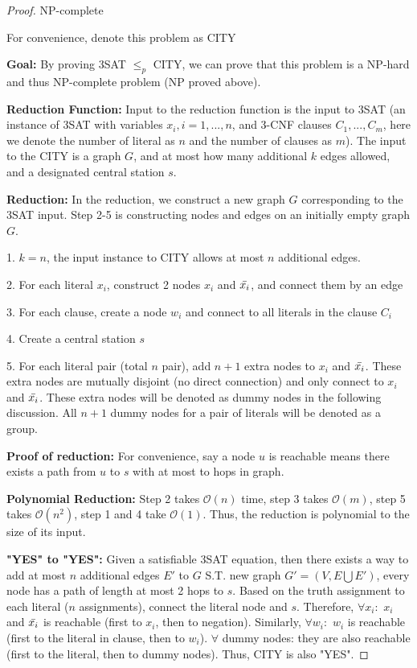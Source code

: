 \documentclass[openany]{article}
\begin{document}
\begin{proof}{NP-complete}

    For convenience, denote this problem as CITY
    
    \textbf{Goal:} By proving 3SAT $\leqslant_p$ CITY, we can prove that this problem is a NP-hard and thus NP-complete problem (NP proved above).

     \textbf{Reduction Function:} Input to the reduction function is the input to 3SAT (an instance of 3SAT with variables $x_i, i = 1,...,n$, and 3-CNF clauses $C_1, ..., C_m$, here we denote the number of literal as $n$ and the number of clauses as $m$). The input to the CITY is a graph $G$, and at most how many additional $k$ edges allowed, and a designated central station $s$. 

    \textbf{Reduction:} In the reduction, we construct a new graph $G$ corresponding to the 3SAT input. Step 2-5 is constructing nodes and edges on an initially empty graph $G$.
    
    1. $k=n$, the input instance to CITY allows at most $n$ additional edges.

    2. For each literal $x_i$, construct 2 nodes $x_i$ and $\Bar{x_i}$, and connect them by an edge

    3. For each clause, create a node $w_i$ and connect to all literals in the clause $C_i$

    4. Create a central station $s$

    5. For each literal pair (total $n$ pair), add $n+1$ extra nodes to $x_i$ and $\Bar{x_i}$. These extra nodes are mutually disjoint (no direct connection) and only connect to $x_i$ and $\Bar{x_i}$. These extra nodes will be denoted as dummy nodes in the following discussion. All $n+1$ dummy nodes for a pair of literals will be denoted as a group.

    \textbf{Proof of reduction:} For convenience, say a node $u$ is reachable means there exists a path from $u$ to $s$ with at most to hops in graph.

    \textbf{Polynomial Reduction:} Step 2 takes $\mathcal{O}(n)$ time, step 3 takes $\mathcal{O}(m)$, step 5 takes $\mathcal{O}(n^2)$, step 1 and 4 take $\mathcal{O}(1)$. Thus, the reduction is polynomial to the size of its input.

    \textbf{"YES" to "YES":} Given a satisfiable 3SAT equation, then there exists a way to add at most $n$ additional edges $E'$ to $G$ S.T. new graph $G'=(V,E\bigcup E')$, every node has a path of length at most 2 hops to $s$. Based on the truth assignment to each literal ($n$ assignments), connect the literal node and $s$. Therefore, $\forall x_i:$ $x_i$ and $\Bar{x_i}$ is reachable (first to $x_i$, then to negation). Similarly, $\forall w_i:$ $w_i$ is reachable (first to the literal in clause, then to $w_i$). $\forall$ dummy nodes: they are also reachable (first to the literal, then to dummy nodes). Thus, CITY is also "YES".


\end{proof}
\end{document}
